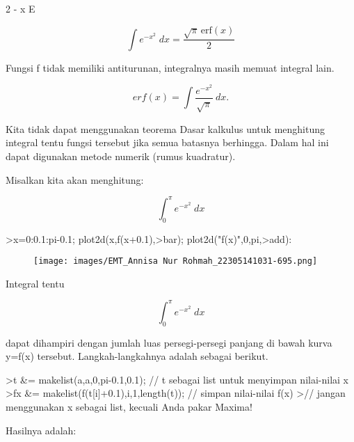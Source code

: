 \documentclass[a4paper,10pt]{article}
\begin{document}
\begin{eulernotebook}
\begin{euleroutput}
                                      2
                                   - x
                                  E
  
\end{euleroutput}
\begin{eulerformula}
\[
\int {e^ {- x^2 }}{\;dx}=\frac{\sqrt{\pi}\,\mathrm{erf}\left(x  \right)}{2}
\]
\end{eulerformula}
\begin{eulercomment}
Fungsi f tidak memiliki antiturunan, integralnya masih memuat integral
lain.

\end{eulercomment}
\begin{eulerformula}
\[
erf(x) = \int \frac{e^{-x^2}}{\sqrt{\pi}} \ dx.
\]
\end{eulerformula}
\begin{eulercomment}
Kita tidak dapat menggunakan teorema Dasar kalkulus untuk menghitung
integral tentu fungsi tersebut jika semua batasnya berhingga. Dalam
hal ini dapat digunakan metode numerik (rumus kuadratur).

Misalkan kita akan menghitung:

\end{eulercomment}
\begin{eulerformula}
\[
\int_{0}^{\pi}{e^ {- x^2 }\;dx}
\]
\end{eulerformula}
\begin{eulerprompt}
>x=0:0.1:pi-0.1; plot2d(x,f(x+0.1),>bar); plot2d("f(x)",0,pi,>add):
\end{eulerprompt}
\begin{figure}[h]
    \centering
    \texttt{[image: images/EMT\_Annisa Nur Rohmah\_22305141031-695.png]}
\end{figure}
\begin{eulercomment}
Integral tentu

\end{eulercomment}
\begin{eulerformula}
\[
\int_{0}^{\pi}{e^ {- x^2 }\;dx}
\]
\end{eulerformula}
\begin{eulercomment}
dapat dihampiri dengan jumlah luas persegi-persegi panjang di bawah
kurva y=f(x) tersebut. Langkah-langkahnya adalah sebagai berikut.
\end{eulercomment}
\begin{eulerprompt}
>t &= makelist(a,a,0,pi-0.1,0.1); // t sebagai list untuk menyimpan nilai-nilai x
>fx &= makelist(f(t[i]+0.1),i,1,length(t)); // simpan nilai-nilai f(x)
>// jangan menggunakan x sebagai list, kecuali Anda pakar Maxima!
\end{eulerprompt}
\begin{eulercomment}
Hasilnya adalah:


\end{eulercomment}
\end{eulernotebook}
\end{document}
